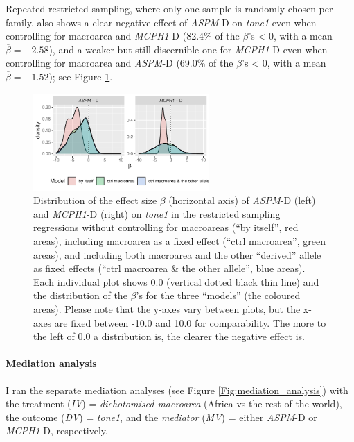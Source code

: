 \documentclass[twoside,onecolumn]{article}
\begin{document}
Repeated restricted sampling, where only one sample is randomly chosen per family, also shows a clear negative effect of \textit{ASPM}-D on \textit{tone1} even when controlling for macroarea and \textit{MCPH1}-D (82.4\% of the $\beta$'s < 0, with a mean $\overline{\beta} = -2.58$), and a weaker but still discernible one for \textit{MCPH1}-D even when controlling for macroarea and \textit{ASPM}-D (69.0\% of the $\beta$'s < 0, with a mean $\overline{\beta} = -1.52$); see Figure \ref{Fig:tone1_regressions_restricted}.

\begin{figure}[h]
  \centering
  \includegraphics[width=0.6\textwidth]{../../code/figures/tone1_regressions_restricted}
  \caption{Distribution of the effect size $\beta$ (horizontal axis) of \textit{ASPM}-D (left) and \textit{MCPH1}-D (right) on \textit{tone1} in the restricted sampling regressions without controlling for macroareas (``by itself'', red areas), including macroarea as a fixed effect (``ctrl macroarea'', green areas), and including both macroarea and the other ``derived'' allele as fixed effects (``ctrl macroarea \& the other allele'', blue areas). Each individual plot shows 0.0 (vertical dotted black thin line) and the distribution of the $\beta$'s for the three ``models'' (the coloured areas). Please note that the y-axes vary between plots, but the x-axes are fixed between -10.0 and 10.0 for comparability. The more to the left of 0.0 a distribution is, the clearer the negative effect is.}
  \label{Fig:tone1_regressions_restricted}
\end{figure}


\paragraph{Mediation analysis}

I ran the separate mediation analyses (see Figure \ref{Fig:mediation_analysis}) with the treatment (\textit{IV}) = \textit{dichotomised macroarea} (Africa vs the rest of the world), the outcome (\textit{DV}) = \textit{tone1}, and the \textit{mediator} (\textit{MV}) = either \textit{ASPM}-D or \textit{MCPH1}-D, respectively.
\end{document}

